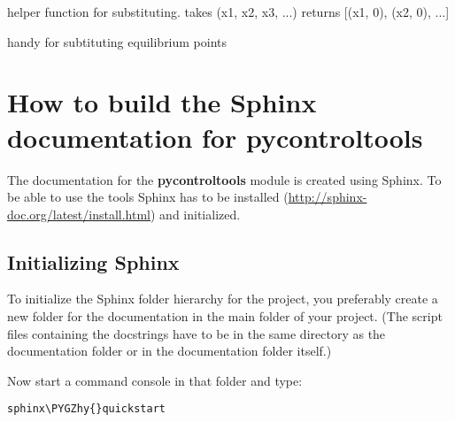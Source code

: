 \documentclass[letterpaper,10pt,english]{sphinxmanual}
\def\PYGZhy{\char`\-}
\begin{document}

\begin{fulllineitems}
\label{pycontroltools:auxfuncs.programming.miscprog.tup0}
helper function for substituting.
takes (x1, x2, x3, ...)
returns {[}(x1, 0), (x2, 0), ...{]}

\end{fulllineitems}


\begin{fulllineitems}
\label{pycontroltools:auxfuncs.programming.miscprog.zip0}
handy for subtituting equilibrium points

\end{fulllineitems}



\section{How to build the Sphinx documentation for pycontroltools}
\label{README:how-to-build-the-sphinx-documentation-for-pycontroltools}\label{README::doc}
The documentation for the \textbf{pycontroltools} module is created using Sphinx.
To be able to use the tools Sphinx has to be installed
(\href{http://sphinx-doc.org/latest/install.html}{http://sphinx-doc.org/latest/install.html})
and initialized.


\subsection{Initializing Sphinx}
\label{README:initializing-sphinx}
To initialize the Sphinx folder hierarchy for the project,
you preferably create a new folder for the documentation in the main folder of
your project.
(The script files containing the docstrings have to be in the same directory
as the documentation folder or in the documentation folder itself.)

Now start a command console in that folder and type:

\begin{Verbatim}[commandchars=\\\{\}]
sphinx\PYGZhy{}quickstart
\end{Verbatim}
\end{document}

